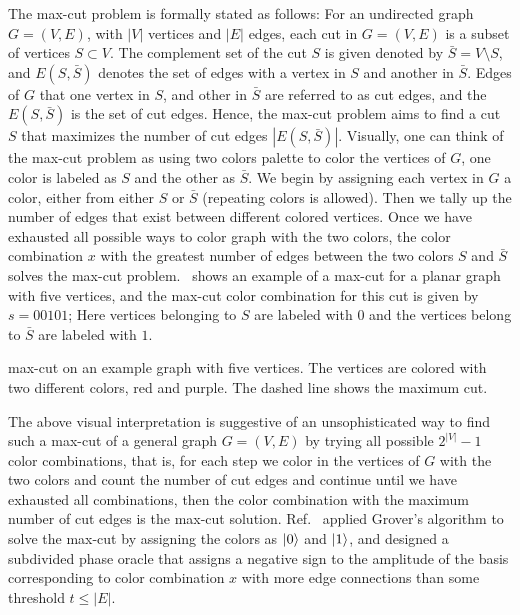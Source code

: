 \bigskip
\noindent
The \acs{max-cut} problem is formally stated as follows: For an undirected graph $G=(V,E)$, with $|V|$ vertices and $|E|$ edges, each cut in $G=(V,E)$ is a subset of vertices $S \subset V$. The complement set of the cut $S$ is given denoted by $\bar{S} = V \setminus S$, and $E(S, \bar{S})$ denotes the set of edges with a vertex in $S$ and another in $\bar{S}$. Edges of $G$ that one vertex in $S$, and other in $\bar{S}$ are referred to as cut edges, and the $E(S, \bar{S})$ is the set of cut edges. Hence, the \acs{max-cut} problem aims to find a cut $S$ that maximizes the number of cut edges $|E(S, \bar{S})|$. Visually, one can think of the \acs{max-cut} problem as using two colors palette to color the vertices of $G$, one color is labeled as $S$ and the other as $\bar{S}$. We begin by assigning each vertex in $G$ a color, either from either $S$ or $\bar{S}$ (repeating colors is allowed). Then we tally up the number of edges that exist between different colored vertices. Once we have exhausted all possible ways to color graph with the two colors, the color combination $x$ with the greatest number of edges between the two colors $S$ and $\bar{S}$ solves the \acs{max-cut} problem.~ shows an example of a \acs{max-cut} for a planar graph with five vertices, and the \acs{max-cut} color combination for this cut is given by $s=00101$; Here vertices belonging to $S$ are labeled with $0$ and the vertices belong to $\bar{S}$ are labeled with $1$.

\begin{marginfigure}[-100pt]
	\centering
    \caption[\acs{max-cut} on an example graph with five vertices. The vertices are colored with two different colors, red and purple. The dashed line shows the maximum cut.]{\acs{max-cut} on an example graph with five vertices. The vertices are colored with two different colors, red and purple. The dashed line shows the maximum cut.}
\end{marginfigure}

\bigskip
\noindent
The above visual interpretation is suggestive of an unsophisticated way to find such a \acs{max-cut} of a general graph $G=(V,E)$ by trying all possible $2^{|V|} - 1$ color combinations, that is, for each step we color in the vertices of $G$ with the two colors and count the number of cut edges and continue until we have exhausted all combinations, then the color combination with the maximum number of cut edges is the \acs{max-cut} solution. Ref.~\cite{Satoh_2020} applied Grover's algorithm to solve the \acs{max-cut} by assigning the colors as $\ket{0}$ and $\ket{1}$, and designed a subdivided phase oracle that assigns a negative sign to the amplitude of the basis corresponding to color combination $x$ with more edge connections than some threshold $t \leq |E|$. 


